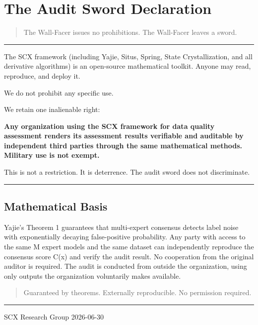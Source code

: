 \documentclass[
  12pt,
]{article}
\author{SCX}
\date{2026}
\begin{document}
\section{The Audit Sword Declaration}\label{the-audit-sword-declaration}

\begin{quote}
The Wall-Facer issues no prohibitions. The Wall-Facer leaves a sword.
\end{quote}

\begin{center}\rule{0.5\linewidth}{0.5pt}\end{center}

The SCX framework (including Yajie, Situs, Spring, State
Crystallization, and all derivative algorithms) is an open-source
mathematical toolkit. Anyone may read, reproduce, and deploy it.

We do not prohibit any specific use.

We retain one inalienable right:

\textbf{Any organization using the SCX framework for data quality
assessment renders its assessment results verifiable and auditable by
independent third parties through the same mathematical methods.
Military use is not exempt.}

This is not a restriction. It is deterrence. The audit sword does not
discriminate.

\begin{center}\rule{0.5\linewidth}{0.5pt}\end{center}

\subsection{Mathematical Basis}\label{mathematical-basis}

Yajie's Theorem 1 guarantees that multi-expert consensus detects label
noise with exponentially decaying false-positive probability. Any party
with access to the same M expert models and the same dataset can
independently reproduce the consensus score C(x) and verify the audit
result. No cooperation from the original auditor is required. The audit
is conducted from outside the organization, using only outputs the
organization voluntarily makes available.

\begin{quote}
Guaranteed by theorems. Externally reproducible. No permission required.
\end{quote}

\begin{center}\rule{0.5\linewidth}{0.5pt}\end{center}

SCX Research Group 2026-06-30
\end{document}
